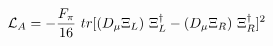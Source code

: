 \begin{equation}
{\cal{L}}_A= -\frac{F_\pi}{16}~tr[(D_\mu \Xi_L)~\Xi_L^\dag - (D_\mu \Xi_R)~\Xi_R^\dag]^2
\end{equation}

